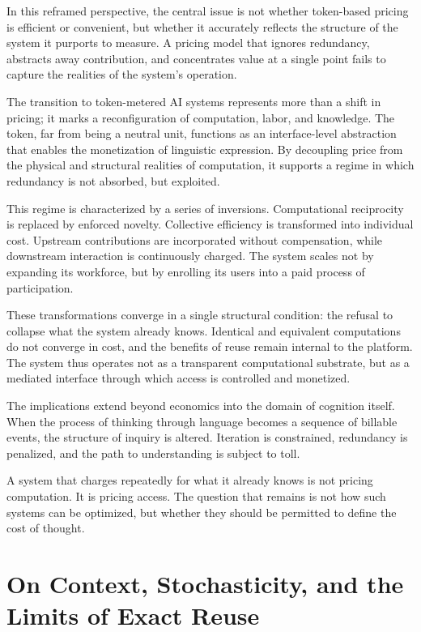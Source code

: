 \documentclass[12pt, oneside]{article}
\begin{document}
In this reframed perspective, the central issue is not whether token-based pricing is efficient or convenient, but whether it accurately reflects the structure of the system it purports to measure. A pricing model that ignores redundancy, abstracts away contribution, and concentrates value at a single point fails to capture the realities of the system’s operation.

The transition to token-metered AI systems represents more than a shift in pricing; it marks a reconfiguration of computation, labor, and knowledge. The token, far from being a neutral unit, functions as an interface-level abstraction that enables the monetization of linguistic expression. By decoupling price from the physical and structural realities of computation, it supports a regime in which redundancy is not absorbed, but exploited.

This regime is characterized by a series of inversions. Computational reciprocity is replaced by enforced novelty. Collective efficiency is transformed into individual cost. Upstream contributions are incorporated without compensation, while downstream interaction is continuously charged. The system scales not by expanding its workforce, but by enrolling its users into a paid process of participation.

These transformations converge in a single structural condition: the refusal to collapse what the system already knows. Identical and equivalent computations do not converge in cost, and the benefits of reuse remain internal to the platform. The system thus operates not as a transparent computational substrate, but as a mediated interface through which access is controlled and monetized.

The implications extend beyond economics into the domain of cognition itself. When the process of thinking through language becomes a sequence of billable events, the structure of inquiry is altered. Iteration is constrained, redundancy is penalized, and the path to understanding is subject to toll.

A system that charges repeatedly for what it already knows is not pricing computation. It is pricing access. The question that remains is not how such systems can be optimized, but whether they should be permitted to define the cost of thought.

\section{On Context, Stochasticity, and the Limits of Exact Reuse}
\end{document}
